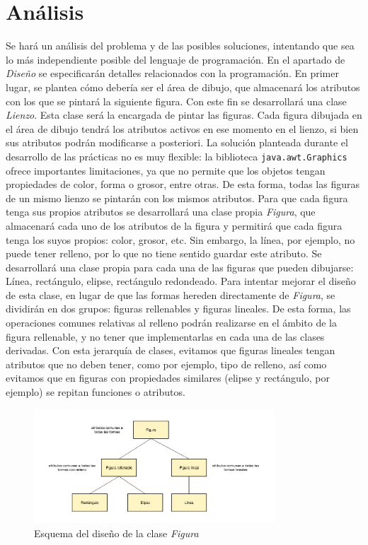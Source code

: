 \clearpage

\section{Análisis}
Se hará un análisis del problema y de las posibles soluciones, intentando que sea lo más independiente posible del lenguaje de programación. En el apartado de \textit{Diseño} se especificarán detalles relacionados con la programación.
\vskip0.3cm
En primer lugar, se plantea cómo debería ser el área de dibujo, que almacenará los atributos con los que se pintará la siguiente figura. Con este fin se desarrollará una clase \textit{Lienzo}. Esta clase será la encargada de pintar las figuras. Cada figura dibujada en el área de dibujo tendrá los atributos activos en ese momento en el lienzo, si bien sus atributos podrán modificarse a posteriori.
\vskip0.3cm
La solución planteada durante el desarrollo de las prácticas no es muy flexible: la biblioteca \texttt{java.awt.Graphics} ofrece importantes limitaciones, ya que no permite que los objetos tengan propiedades de color, forma o grosor, entre otras. De esta forma, todas las figuras de un mismo lienzo se pintarán con los mismos atributos.
\vskip0.3cm
Para que cada figura tenga sus propios atributos se desarrollará una clase propia \textit{Figura}, que almacenará cada uno de los atributos de la figura y permitirá que cada figura tenga los suyos propios: color, grosor, etc. Sin embargo, la línea, por ejemplo, no puede tener relleno, por lo que no tiene sentido guardar este atributo. Se desarrollará una clase propia para cada una de las figuras que pueden dibujarse: Línea, rectángulo, elipse, rectángulo redondeado.
\vskip0.3cm
Para intentar mejorar el diseño de esta clase, en lugar de que las formas hereden directamente de \textit{Figura}, se dividirán en dos grupos: figuras rellenables y figuras lineales. De esta forma, las operaciones comunes relativas al relleno podrán realizarse en el ámbito de la figura rellenable, y no tener que implementarlas en cada una de las clases derivadas. Con esta jerarquía de clases, evitamos que figuras lineales tengan atributos que no deben tener, como por ejemplo, tipo de relleno, así como evitamos que en figuras con propiedades similares (elipse y rectángulo, por ejemplo) se repitan funciones o atributos.
\vskip0.3cm
\begin{figure}[H]
 \centering
  \includegraphics[width=0.8\textwidth]{esquemaFormas.png}
 \caption{Esquema del diseño de la clase \textit{Figura}}
 \label{diseño}
 \end{figure}
